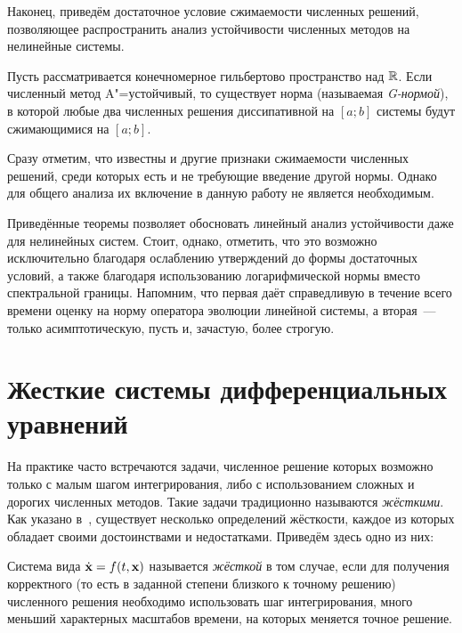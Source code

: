 Наконец, приведём достаточное условие сжимаемости численных решений,
позволяющее распространить анализ устойчивости численных методов на нелинейные системы.

\begin{theorem}[Далквист, 1978]
    Пусть рассматривается конечномерное гильбертово пространство над $ \mathbb{R} $.
    Если численный метод A"=устойчивый, то существует норма (называемая \emph{G-нормой}),
    в которой любые два численных решения диссипативной на $ [a; b] $ системы будут сжимающимися на $ [a; b] $.
\end{theorem}

Сразу отметим, что известны и другие признаки сжимаемости численных решений,
среди которых есть и не требующие введение другой нормы.
Однако для общего анализа их включение в данную работу не является необходимым.

Приведённые теоремы позволяет обосновать линейный анализ устойчивости даже для нелинейных систем.
Стоит, однако, отметить, что это возможно исключительно благодаря ослаблению утверждений до формы достаточных условий,
а также благодаря использованию логарифмической нормы вместо спектральной границы.
Напомним, что первая даёт справедливую в течение всего времени оценку на норму оператора эволюции линейной системы,
а вторая~--- только асимптотическую, пусть и, зачастую, более строгую.



\section{Жесткие системы дифференциальных уравнений}
\label{section:stiffness}

На практике часто встречаются задачи,
численное решение которых возможно только с малым шагом интегрирования,
либо с использованием сложных и дорогих численных методов.
Такие задачи традиционно называются \emph{жёсткими}.
Как указано в~\cite{heirer1999solvingode2, lambert1991methods}, существует несколько определений жёсткости,
каждое из которых обладает своими достоинствами и недостатками.
Приведём здесь одно из них:

\begin{definition}
    \label{definition:stiffness:stiffness}
    Система вида $ \dot{\mathbf{x}} = f(t, \mathbf{x}) $ называется \emph{жёсткой} в том случае,
    если для получения корректного (то есть в заданной степени близкого к точному решению)
    численного решения необходимо использовать шаг интегрирования,
    много меньший характерных масштабов времени, на которых меняется точное решение.
\end{definition}

